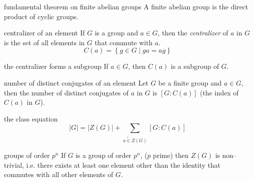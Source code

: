 \documentclass[avery5371,grid]{flashcards}
\begin{document}
\begin{flashcard}[Theorem]{fundamental theorem on finite abelian groups}
A finite abelian group is the direct product of cyclic groups. 
\end{flashcard}

\begin{flashcard}[Definition]{centralizer of an element}
If $G$ is a group and $a \in G$, then the \textit{centralizer} of $a$ in $G$ is the
set of all elements in $G$ that commute with $a$.
\begin{equation*}
C(a) = \left\lbrace g \in G \mid ga = ag \right\rbrace 
\end{equation*}
\end{flashcard}

\begin{flashcard}[Lemma]{the centralizer forms a subgroup}
If $a \in G$, then $C(a)$ is a subgroup of $G$.
\end{flashcard}

\begin{flashcard}[Theorem]{number of distinct conjugates of an element}
Let $G$ be a finite group and $a \in G$, then the number of distinct
conjugates of $a$ in $G$ is $[G : C(a)]$ (the index of $C(a)$ in $G$).
\end{flashcard}

\begin{flashcard}[Theorem]{the class equation}
\begin{equation*}
|G| = |Z(G)| + \sum_{a \not{\in} Z(G)}[G : C(a)]
\end{equation*}
\end{flashcard}

\begin{flashcard}[Theorem]{groups of order $p^{n}$}
If $G$ is a group of order $p^{n}$, ($p$ prime) then $Z(G)$ is
non--trivial, i.e. there exists at least one element other than
the identity that commutes with all other elements of $G$.
\end{flashcard}
\end{document}
